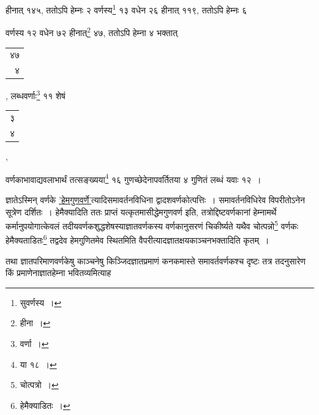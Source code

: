 \documentclass[10pt, openany]{book}
\begin{document}
{{ 

\vspace{0.3cm}{उत्पन्नवर्णकेन १२ हेमैक्यात् १३ आहतात् १५६, हेम्नः १ वर्णस्य ११ वधेन
११}
{हीनात् १४५, ततोऽपि हेम्नः २ वर्णस्य\renewcommand{\thefootnote}{\s १२}\footnote{\s सुवर्णस्य~।}  १३ वधेन २६ हीनात् ११९, ततोऽपि
हेम्नः ६}
{वर्णस्य १२ वधेन ७२ हीनात्\renewcommand{\thefootnote}{\s १३}\footnote{\s हीना~।}  ४७, ततोऽपि हेम्ना ४ भक्तात्\begin{tabular}{r}४७\\ ४\end{tabular},
लब्धवर्णाः\renewcommand{\thefootnote}{\s १४}\footnote{\s *वर्णा~।}  ११ शेषं\begin{tabular}{r}३\\ ४\end{tabular},}
{वर्णकाभावाद्यवलाभार्थं तत्सङ्ख्यया\renewcommand{\thefootnote}{\s १५}\footnote{\s *या १८~।}  १६ गुणच्छेदेनापवर्तितया ४
गुणितं लब्धं यवाः १२~।}
\vspace{3mm}

{ज्ञातेऽस्मिन् वर्णके \hyperref[52]{'हेमगुणवर्णे'}त्यादिसमावर्तनविधिना
द्वादशवर्णकोत्पत्तिः~। समावर्तनविधिरेव विपरीतोऽनेन सूत्रेण दर्शितः~। हेमैक्यादिति ततः प्राप्तं
यत्कृतमासीद्धेमगुणवर्ण इति,}
{तत्रोद्दिष्टवर्णकानां हेम्नामर्थे कर्मानुपयोगात्केवलं
तदीयवर्णकशुद्धशेषस्याज्ञातवर्णकस्य वर्णकानुसरणं चिकीर्ष्यते यथैव चोत्पन्नो\renewcommand{\thefootnote}{\s १६}\footnote{\s चोत्पत्रो~।}  वर्णकः हेमैक्यताडितः\renewcommand{\thefootnote}{\s १७}\footnote{\s हेमैक्याडितः~।} 
तद्वदेव हेमगुणितमेव स्थितमिति}
{वैपरीत्यादज्ञातक्षयकाञ्चनभक्तादिति कृतम्~।}

\newpage

{तथा ज्ञातपरिमाणवर्णकेषु काञ्चनेषु किञ्जिदज्ञातप्रमाणं कनकमास्ते
समावर्तवर्णकश्च}
{दृष्टः तत्र तदनुसारेण किं प्रमाणेनाज्ञातहेम्ना भवितव्यमित्याह\textemdash}

}}
\end{document}
